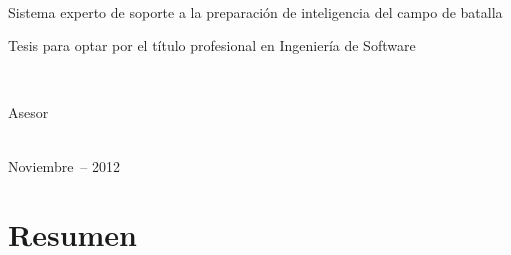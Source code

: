 \documentclass[12pt,a4paper,footinclude=true,headinclude=true,spanish]{scrbook}
\newcommand*{\ruta}{/gcca/hogar/Dropbox/gcca/gueco/doc/expo/tesis}%
\begin{document}
\frenchspacing
\raggedbottom



\begin{titlepage}
  \begin{addmargin}[-1cm]{-3cm}
    \begin{center}
      \large

      \hfill

      \vfill

      \begingroup
      \color{Maroon} \\ \bigskip
      \endgroup
      Sistema experto de soporte a la preparación de inteligencia del campo de batalla

      \vfill

      Tesis para optar por el título profesional en Ingeniería de Software

      \vfill

      \\

      \vfill


      Asesor \\
       \\
      \medskip

      \vfill

      \vfill

      Noviembre\ -- 2012

      \vfill

    \end{center}
  \end{addmargin}
\end{titlepage}


\chapter*{Resumen}

\tableofcontents
\listoftables
\listoffigures
\end{document}
